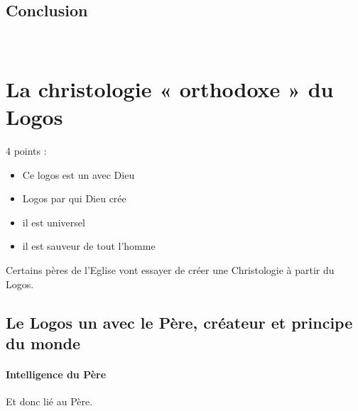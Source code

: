     
    \subsection{Conclusion}
    
  
 ~
  \hypertarget{la-christologie-orthodoxe-du-logos}{%
  \section{La christologie « orthodoxe » du
  Logos}\label{la-christologie-orthodoxe-du-logos}}

  
  4 points : 
  \begin{itemize}
      \item Ce logos est un avec Dieu
      \item Logos par qui Dieu crée
      \item il est universel
      \item il est sauveur de tout l'homme
  \end{itemize}
  Certains pères de l'Eglise vont essayer de créer une Christologie à partir du Logos.
  
    
    \subsection{Le Logos un avec le Père, créateur et principe du monde}
  
  \paragraph{Intelligence du Père} Et donc lié au Père.
  
